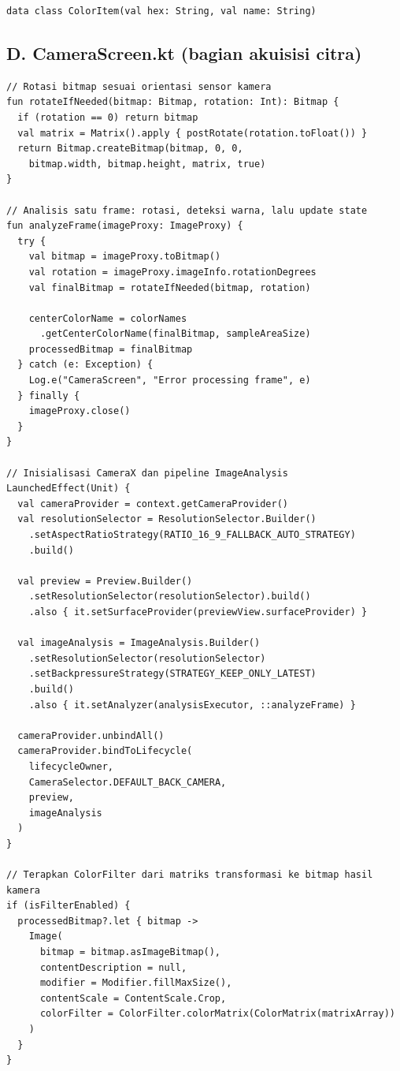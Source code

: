 {\begin{lstlisting}[caption={Implementasi klasifikasi nama warna berbasis ruang warna HSV dengan pendekatan \textit{rule-based thresholding}}, label={lst:colornames}]
data class ColorItem(val hex: String, val name: String)
\end{lstlisting}

\subsection*{D. CameraScreen.kt (bagian akuisisi citra)}

\begin{lstlisting}[caption={Inisialisasi CameraX dan loop analisis frame secara \textit{real-time}}, label={lst:camerascreen}]
// Rotasi bitmap sesuai orientasi sensor kamera
fun rotateIfNeeded(bitmap: Bitmap, rotation: Int): Bitmap {
  if (rotation == 0) return bitmap
  val matrix = Matrix().apply { postRotate(rotation.toFloat()) }
  return Bitmap.createBitmap(bitmap, 0, 0,
    bitmap.width, bitmap.height, matrix, true)
}

// Analisis satu frame: rotasi, deteksi warna, lalu update state
fun analyzeFrame(imageProxy: ImageProxy) {
  try {
    val bitmap = imageProxy.toBitmap()
    val rotation = imageProxy.imageInfo.rotationDegrees
    val finalBitmap = rotateIfNeeded(bitmap, rotation)

    centerColorName = colorNames
      .getCenterColorName(finalBitmap, sampleAreaSize)
    processedBitmap = finalBitmap
  } catch (e: Exception) {
    Log.e("CameraScreen", "Error processing frame", e)
  } finally {
    imageProxy.close()
  }
}

// Inisialisasi CameraX dan pipeline ImageAnalysis
LaunchedEffect(Unit) {
  val cameraProvider = context.getCameraProvider()
  val resolutionSelector = ResolutionSelector.Builder()
    .setAspectRatioStrategy(RATIO_16_9_FALLBACK_AUTO_STRATEGY)
    .build()

  val preview = Preview.Builder()
    .setResolutionSelector(resolutionSelector).build()
    .also { it.setSurfaceProvider(previewView.surfaceProvider) }

  val imageAnalysis = ImageAnalysis.Builder()
    .setResolutionSelector(resolutionSelector)
    .setBackpressureStrategy(STRATEGY_KEEP_ONLY_LATEST)
    .build()
    .also { it.setAnalyzer(analysisExecutor, ::analyzeFrame) }

  cameraProvider.unbindAll()
  cameraProvider.bindToLifecycle(
    lifecycleOwner,
    CameraSelector.DEFAULT_BACK_CAMERA,
    preview,
    imageAnalysis
  )
}

// Terapkan ColorFilter dari matriks transformasi ke bitmap hasil kamera
if (isFilterEnabled) {
  processedBitmap?.let { bitmap ->
    Image(
      bitmap = bitmap.asImageBitmap(),
      contentDescription = null,
      modifier = Modifier.fillMaxSize(),
      contentScale = ContentScale.Crop,
      colorFilter = ColorFilter.colorMatrix(ColorMatrix(matrixArray))
    )
  }
}
\end{lstlisting}

}
